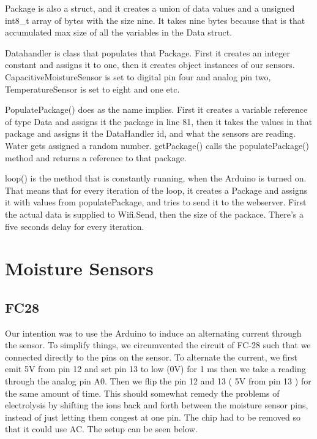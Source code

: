 \documentclass[a4paper,12pt,twoside,openright,titlepage]{book}
\begin{document}
Package is also a struct, and it creates a union of data values and a unsigned int8\_t array of bytes with the size nine. It takes nine bytes because that is that accumulated max size of all the variables in the Data struct.

Datahandler is class that populates that Package. First it creates an integer constant and assigns it to one, then it creates object instances of our sensors. CapacitiveMoistureSensor is set to digital pin four and analog pin two, TemperatureSensor is set to eight and one etc. 

PopulatePackage() does as the name implies. First it creates a variable reference of type Data and assigns it the package in line 81, then it takes the values in that package and assigns it the DataHandler id, and what the sensors are reading. Water gets assigned a random number. getPackage() calls the populatePackage() method and returns a reference to that package.

loop() is the method that is constantly running, when the Arduino is turned on. That means that for every iteration of the loop, it creates a Package and assigns it with values from populatePackage, and tries to send it to the webserver. First the actual data is supplied to Wifi.Send, then the size of the packace. There's a five seconds delay for every iteration.

\section{Moisture Sensors}
\subsection{FC28}
Our intention was to use the Arduino to induce an alternating current through the sensor. To simplify things, we circumvented the circuit of FC-28 such that we connected directly to the pins on the sensor. To alternate the current, we first emit 5V from pin 12 and set pin 13 to low (0V) for 1 ms then we take a reading through the analog pin A0. Then we flip the pin 12 and 13 ( 5V from pin 13 ) for the same amount of time. This should somewhat remedy the problems of electrolysis by shifting the ions back and forth between the moisture sensor pins, instead of just letting them congest at one pin. The chip had to be removed so that it could use AC.
The setup can be seen below.
\end{document}
